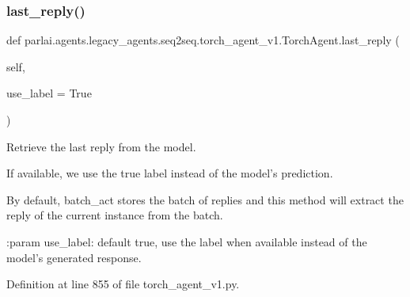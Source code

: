 \mbox{\label{classparlai_1_1agents_1_1legacy__agents_1_1seq2seq_1_1torch__agent__v1_1_1TorchAgent_abf7a50ea0eb319737123d2e46fde4c0f}} 
\subsubsection{\texorpdfstring{last\+\_\+reply()}{last\_reply()}}
{\footnotesize\ttfamily def parlai.\+agents.\+legacy\+\_\+agents.\+seq2seq.\+torch\+\_\+agent\+\_\+v1.\+Torch\+Agent.\+last\+\_\+reply (\begin{DoxyParamCaption}\item[{}]{self,  }\item[{}]{use\+\_\+label = {\ttfamily True} }\end{DoxyParamCaption})}

\begin{DoxyVerb}Retrieve the last reply from the model.

If available, we use the true label instead of the model's prediction.

By default, batch_act stores the batch of replies and this method
will extract the reply of the current instance from the batch.

:param use_label: default true, use the label when available instead of
          the model's generated response.
\end{DoxyVerb}
 

Definition at line 855 of file torch\+\_\+agent\+\_\+v1.\+py.



